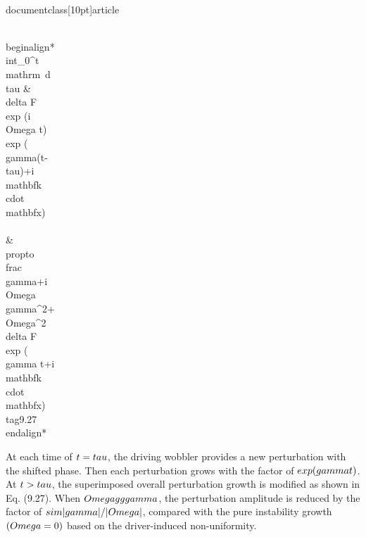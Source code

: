 \\documentclass[10pt]{article}
\begin{document}
{{{{{{\\begin{align*}
\\int_{0}^{t} \\mathrm{~d} \\tau & \\delta F \\exp (i \\Omega t) \\exp (\\gamma(t-\\tau)+i \\mathbf{k} \\cdot \\mathbf{x}) \\\\
& \\propto \\frac{\\gamma+i \\Omega}{\\gamma^{2}+\\Omega^{2}} \\delta F \\exp (\\gamma t+i \\mathbf{k} \\cdot \\mathbf{x}) \\tag{9.27}
\\end{align*}


At each time of $t=\\tau$, the driving wobbler provides a new perturbation with the shifted phase. Then each perturbation grows with the factor of $\\exp (\\gamma t)$. At $t>\\tau$, the superimposed overall perturbation growth is modified as shown in Eq. (9.27). When $\\Omega \\gg \\gamma$, the perturbation amplitude is reduced by the factor of $\\sim|\\gamma| /|\\Omega|$, compared with the pure instability growth $(\\Omega=0)$ based on the driver-induced non-uniformity.

}}}}}}
\end{document}
